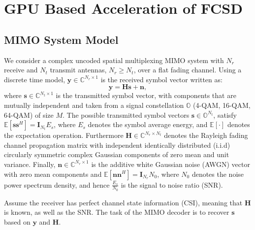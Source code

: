 \documentclass[letterpaper, 10pt, conference, twoside]{ieeeconf}
\begin{document}
\section{GPU Based Acceleration of FCSD}\label{GPUFCSD}
\subsection{MIMO System Model}\label{system}

We consider a complex uncoded spatial multiplexing MIMO system with $N_r$ receive and $N_t$ transmit antennas, $N_{r}\geq N_{t}$, over a flat fading channel. Using a discrete time model, $\mathbf{y}\in\mathbb{C}^{N_{r}\times 1}$ is the received symbol vector written as:
\begin{equation}
\mathbf{y}=\mathbf{H}\mathbf{s}+\mathbf{n},   \label{formula 1}
\end{equation}
where $\mathbf{s}\in \mathbb{C}^{N_{t}\times 1}$ is the transmitted symbol vector, with components that are mutually independent and taken from a signal constellation $\mathbb{O}$ (4-QAM, 16-QAM, 64-QAM) of size $M$. The possible transmitted symbol vectors $\mathbf{s}\in \mathbb{O}^{N_{t}}$, satisfy $\mathbb{E}[\mathbf{s}\mathbf{s}^{H}]=\mathbf{I}_{N_t}E_{s}$, where $E_{s}$ denotes the symbol average energy, and $\mathbb{E}[\cdot]$ denotes the expectation operation. Furthermore $\mathbf{H}\in \mathbb{C}^{N_{r}\times N_{t}}$ denotes the Rayleigh fading channel propagation matrix with independent identically distributed (i.i.d) circularly symmetric complex Gaussian components of zero mean and unit variance. Finally, $\mathbf{n}\in \mathbb{C}^{N_{r}\times 1}$ is the additive white Gaussian noise (AWGN) vector with zero mean components and $\mathbb{E}[\mathbf{n}\mathbf{n}^{H}]=\mathbf{I}_{N_{r}}N_{0}$, where $N_{0}$ denotes the noise power spectrum density, and hence $\frac{E_{s}}{N_{0}}$ is the signal to noise ratio (SNR). 

Assume the receiver has perfect channel state information (CSI), meaning that $ \mathbf{H}$ is known, as well as the SNR. The task of the MIMO decoder is to recover $\mathbf{s}$ based on $\mathbf{y}$ and $\mathbf{H}$.
\end{document}
